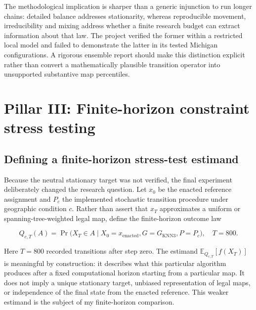 \documentclass[
  10pt,
]{article}
\begin{document}
The methodological implication is sharper than a generic injunction to
run longer chains: detailed balance addresses stationarity, whereas
reproducible movement, irreducibility and mixing address whether a
finite research budget can extract information about that law. The
project verified the former within a restricted local model and failed
to demonstrate the latter in its tested Michigan configurations. A
rigorous ensemble report should make this distinction explicit rather
than convert a mathematically plausible transition operator into
unsupported substantive map percentiles.

\hypertarget{pillar-iii-finite-horizon-constraint-stress-testing}{%
\section{Pillar III: Finite-horizon constraint stress
testing}\label{pillar-iii-finite-horizon-constraint-stress-testing}}

\hypertarget{defining-a-finite-horizon-stress-test-estimand}{%
\subsection{Defining a finite-horizon stress-test
estimand}\label{defining-a-finite-horizon-stress-test-estimand}}

Because the neutral stationary target was not verified, the final
experiment deliberately changed the research question. Let \(x_0\) be
the enacted reference assignment and \(P_c\) the implemented stochastic
transition procedure under geographic condition \(c\). Rather than
assert that \(x_T\) approximates a uniform or spanning-tree-weighted
legal map, define the finite-horizon outcome law

\begin{equation}
Q_{c,T}(A)
=\Pr\bigl(X_T\in A\mid X_0=x_{\mathrm{enacted}},
G=G_{\mathrm{KNN3}},P=P_c\bigr),\quad T=800.
\end{equation}

Here \(T=800\) recorded transitions after step zero. The estimand
\(\mathbb{E}_{Q_{c,T}}[f(X_T)]\) is meaningful by construction: it
describes what this particular algorithm produces after a fixed
computational horizon starting from a particular map. It does not imply
a unique stationary target, unbiased representation of legal maps, or
independence of the final state from the enacted reference. This weaker
estimand is the subject of my finite-horizon comparison.
\end{document}
